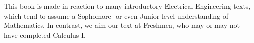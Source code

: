 This book is made in reaction to many introductory Electrical Engineering texts, which tend to assume a Sophomore- or even Junior-level understanding of Mathematics.  In contrast, we aim our text at Freshmen, who may or may not have completed Calculus I.
